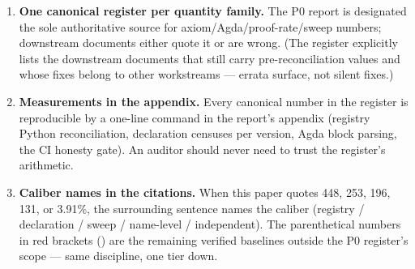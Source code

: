 \begin{enumerate}
\item \textbf{One canonical register per quantity family.} The P0
report is designated the sole authoritative source for
axiom/Agda/proof-rate/sweep numbers; downstream documents either
quote it or are wrong. (The register explicitly lists the
downstream documents that still carry pre-reconciliation values
and whose fixes belong to other workstreams --- errata surface,
not silent fixes.)
\item \textbf{Measurements in the appendix.} Every canonical number
in the register is reproducible by a one-line command in the
report's appendix (registry Python reconciliation, declaration
censuses per version, Agda block parsing, the CI honesty gate).
An auditor should never need to trust the register's arithmetic.
\item \textbf{Caliber names in the citations.} When this paper
quotes 448, 253, 196, 131, or 3.91\%, the surrounding sentence
names the caliber (registry / declaration / sweep / name-level /
independent). The parenthetical numbers in red brackets
() are the remaining verified baselines outside the P0
register's scope --- same discipline, one tier down.
\end{enumerate}
